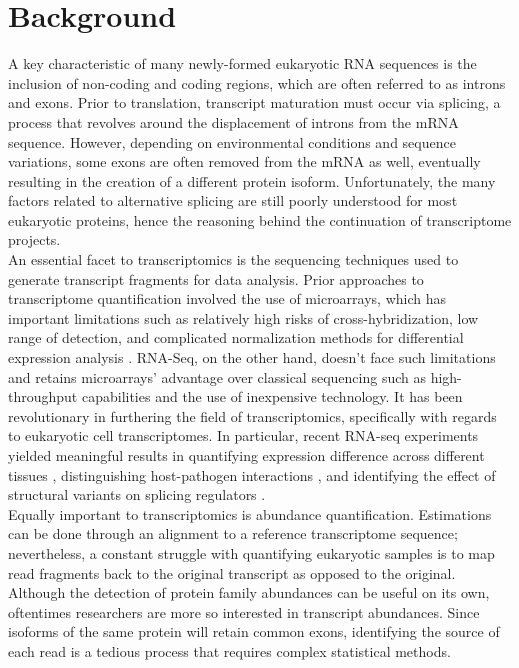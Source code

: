 \section{Background}
A key characteristic of many newly-formed eukaryotic RNA sequences is the 
inclusion of non-coding and coding regions, which are often referred to as introns and exons. 
Prior to translation, transcript maturation must occur via splicing, 
a process that revolves around the displacement of introns from the mRNA sequence. 
However, depending on environmental conditions and sequence variations, 
some exons are often removed from the mRNA as well, eventually resulting in 
the creation of a different protein isoform. 
Unfortunately, the many factors related to alternative splicing are still poorly understood 
for most eukaryotic proteins, hence the reasoning behind the continuation of transcriptome projects.
\\
An essential facet to transcriptomics is the sequencing techniques used to generate transcript 
fragments for data analysis. Prior approaches to transcriptome quantification involved the use 
of microarrays, which has important limitations such as relatively high risks of cross-hybridization, 
low range of detection, and complicated normalization methods for differential expression analysis 
\cite{Wang_Gerstein_Snyder_2009}. 
RNA-Seq, on the other hand, doesn’t face such limitations and retains microarrays’ 
advantage over classical sequencing such as high-throughput capabilities and the use of inexpensive technology. 
It has been revolutionary in furthering the field of transcriptomics, specifically with regards to eukaryotic cell transcriptomes. 
In particular, recent RNA-seq experiments yielded meaningful results in quantifying expression 
difference across different tissues \cite{Glinos_et_al._2022}, distinguishing host-pathogen interactions 
\cite{Pisu_Huang_Grenier_Russell_2020}, and identifying the effect of structural variants on splicing regulators 
\cite{Pascal_et_al._2023}. 
\\	
Equally important to transcriptomics is abundance quantification. 
Estimations can be done through an alignment to a reference transcriptome sequence; nevertheless, a constant struggle with quantifying eukaryotic samples is to map read fragments back to the original transcript as opposed to the original. Although the detection of protein family abundances can be useful on its own, oftentimes researchers are more so interested in transcript abundances. Since isoforms of the same protein will retain common exons, identifying the source of each read is a tedious process that requires complex statistical methods.
